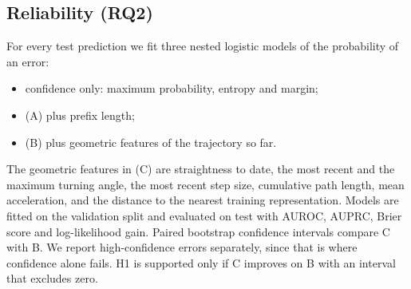 \subsection{Reliability (RQ2)}\label{sec:method-rel}
For every test prediction we fit three nested logistic models of the
probability of an error:
\begin{itemize}[leftmargin=1.2em,itemsep=0pt,topsep=1pt]
  \item[(A)] confidence only: maximum probability, entropy and margin;
  \item[(B)] (A) plus prefix length;
  \item[(C)] (B) plus geometric features of the trajectory so far.
\end{itemize}
The geometric features in (C) are straightness to date, the most recent and
the maximum turning angle, the most recent step size, cumulative path length,
mean acceleration, and the distance to the nearest training representation.
Models are fitted on the validation split and evaluated on test with AUROC,
AUPRC, Brier score and log-likelihood gain. Paired bootstrap confidence
intervals compare C with B. We report high-confidence errors separately,
since that is where confidence alone fails. H1 is supported only if C
improves on B with an interval that excludes zero.

